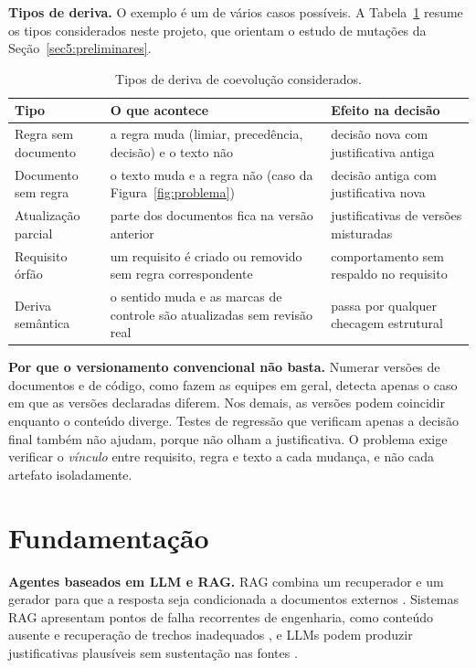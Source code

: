 \documentclass[12pt]{article}
\begin{document}
\textbf{Tipos de deriva.} O exemplo é um de vários casos possíveis. A Tabela~\ref{tab:tipos_deriva} resume os tipos considerados neste projeto, que orientam o estudo de mutações da Seção~\ref{sec5:preliminares}.

\begin{table}[!ht]
\centering
\caption{Tipos de deriva de coevolução considerados.}
\label{tab:tipos_deriva}
\small
\begin{tabularx}{\linewidth}{l X X}
\toprule
\textbf{Tipo} & \textbf{O que acontece} & \textbf{Efeito na decisão} \\
\midrule
Regra sem documento & a regra muda (limiar, precedência, decisão) e o texto não & decisão nova com justificativa antiga \\
Documento sem regra & o texto muda e a regra não (caso da Figura~\ref{fig:problema}) & decisão antiga com justificativa nova \\
Atualização parcial & parte dos documentos fica na versão anterior & justificativas de versões misturadas \\
Requisito órfão & um requisito é criado ou removido sem regra correspondente & comportamento sem respaldo no requisito \\
Deriva semântica & o sentido muda e as marcas de controle são atualizadas sem revisão real & passa por qualquer checagem estrutural \\
\bottomrule
\end{tabularx}
\end{table}

\textbf{Por que o versionamento convencional não basta.} Numerar versões de documentos e de código, como fazem as equipes em geral, detecta apenas o caso em que as versões declaradas diferem. Nos demais, as versões podem coincidir enquanto o conteúdo diverge. Testes de regressão que verificam apenas a decisão final também não ajudam, porque não olham a justificativa. O problema exige verificar o \textit{vínculo} entre requisito, regra e texto a cada mudança, e não cada artefato isoladamente.

\section{Fundamentação}
\label{sec3:fundamentacao}

\textbf{Agentes baseados em LLM e RAG.} RAG combina um recuperador e um gerador para que a resposta seja condicionada a documentos externos \cite{lewis2020rag,gao2023ragsurvey}. Sistemas RAG apresentam pontos de falha recorrentes de engenharia, como conteúdo ausente e recuperação de trechos inadequados \cite{barnett2024sevenfailure}, e LLMs podem produzir justificativas plausíveis sem sustentação nas fontes \cite{ji2023hallucination,liu2024lostmiddle}.
\end{document}
